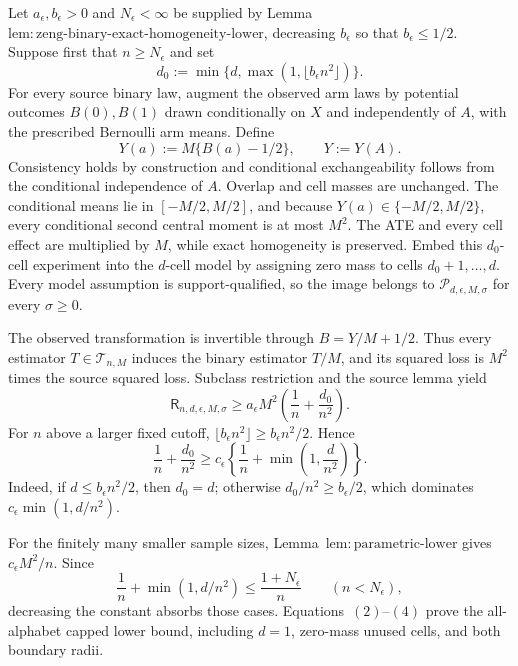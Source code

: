 Let \(a_{\epsilon},b_{\epsilon}>0\) and \(N_{\epsilon}<\infty\) be supplied by Lemma~\(\mathrm{lem:zeng\text{-}binary\text{-}exact\text{-}homogeneity\text{-}lower}\), decreasing \(b_{\epsilon}\) so that \(b_{\epsilon}\le1/2\).  Suppose first that \(n\ge N_{\epsilon}\) and set
\[
 d_0:=\min\{d,\max(1,\lfloor b_{\epsilon}n^2\rfloor)\}.
\tag{1}
\]
For every source binary law, augment the observed arm laws by potential outcomes \(B(0),B(1)\) drawn conditionally on \(X\) and independently of \(A\), with the prescribed Bernoulli arm means.  Define
\[
 Y(a):=M\{B(a)-1/2\},\qquad Y:=Y(A).
\]
Consistency holds by construction and conditional exchangeability follows from the conditional independence of \(A\).  Overlap and cell masses are unchanged.  The conditional means lie in \([-M/2,M/2]\), and because \(Y(a)\in\{-M/2,M/2\}\), every conditional second central moment is at most \(M^2\).  The ATE and every cell effect are multiplied by \(M\), while exact homogeneity is preserved.  Embed this \(d_0\)-cell experiment into the \(d\)-cell model by assigning zero mass to cells \(d_0+1,\ldots,d\).  Every model assumption is support-qualified, so the image belongs to \(\mathcal P_{d,\epsilon,M,\sigma}\) for every \(\sigma\ge0\).

The observed transformation is invertible through \(B=Y/M+1/2\).  Thus every estimator \(T\in\mathcal T_{n,M}\) induces the binary estimator \(T/M\), and its squared loss is \(M^2\) times the source squared loss.  Subclass restriction and the source lemma yield
\[
 \mathsf R_{n,d,\epsilon,M,\sigma}
 \ge a_{\epsilon}M^2\left(\frac1n+\frac{d_0}{n^2}\right).
\tag{2}
\]
For \(n\) above a larger fixed cutoff, \(\lfloor b_{\epsilon}n^2\rfloor\ge b_{\epsilon}n^2/2\).  Hence
\[
 \frac1n+\frac{d_0}{n^2}
 \ge c_{\epsilon}\left\{\frac1n+\min\left(1,\frac d{n^2}\right)\right\}.
\tag{3}
\]
Indeed, if \(d\le b_{\epsilon}n^2/2\), then \(d_0=d\); otherwise \(d_0/n^2\ge b_{\epsilon}/2\), which dominates \(c_{\epsilon}\min(1,d/n^2)\).

For the finitely many smaller sample sizes, Lemma~\(\mathrm{lem:parametric\text{-}lower}\) gives \(c_{\epsilon}M^2/n\).  Since
\[
 \frac1n+\min(1,d/n^2)\le \frac{1+N_{\epsilon}}n
 \qquad (n<N_{\epsilon}),
\tag{4}
\]
decreasing the constant absorbs those cases.  Equations~\((2)\)--\((4)\) prove the all-alphabet capped lower bound, including \(d=1\), zero-mass unused cells, and both boundary radii.